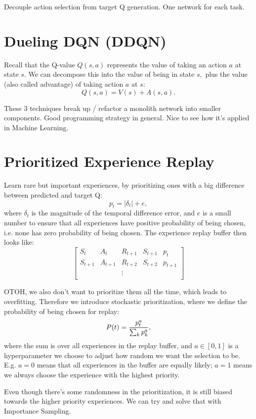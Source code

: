 \documentclass[10pt]{article}
\theoremstyle{plain}
\theoremstyle{definition}
\theoremstyle{remark}
\renewcommand\frac[2]{\genfrac{}{}{0.5pt}{}{#1}{#2}}
\newcommand{\0}{\varnothing}
\newcommand{\<}{\langle}
\renewcommand{\>}{\rangle}
\begin{document}
Decouple action selection from target Q generation. One network for each task.

\section{Dueling DQN (DDQN)}

Recall that the Q-value $ Q(s, a) $ represents the value of taking an action $ a
$ at state $ s. $ We can decompose this into the value of being in state $ s, $
plus the value (also called advantage) of taking action $ a $ at $ s: $ $$
  Q(s, a) = V(s) + A(s, a).
$$

These 3 techniques break up / refactor a monolith network into smaller components. Good programming strategy in general. Nice to see how it's applied in Machine Learning.

\section{Prioritized Experience Replay}

Learn rare but important experiences, by prioritizing ones with a big difference between predicted and target Q: $$
p _ { t } = \left| \delta _ { t } \right| + e,
$$
where $ \delta_t $ is the magnitude of the temporal difference error, and $ e $ is a small number to ensure that all experiences have positive probability of being chosen, i.e. none has zero probability of being chosen. The experience replay buffer then looks like: $$
\begin{bmatrix}
S_t & A_t & R_{t+1} & S_{t+1} & p_t \\
S_{t+1} & A_{t+1} & R_{t+2} & S_{t+2} & p_{t+1} \\
& & \vdots & & \\
\end{bmatrix}
$$

OTOH, we also don't want to prioritize them all the time, which leads to overfitting. Therefore we introduce stochastic prioritization, where we define the probability of being chosen for replay: $$
P(t) = \frac{p_t^a}{\sum_k p_k^a},
$$
where the sum is over all experiences in the replay buffer, and $ a \in [0, 1] $ is a hyperparameter we choose to adjust how random we want the selection to be. E.g. $ a = 0 $ means that all experiences in the buffer are equally likely; $ a = 1 $ means we always choose the experience with the highest priority.

Even though there's some randomness in the prioritization, it is still biased towards the higher priority experiences. We can try and solve that with Importance Sampling.
\end{document}
